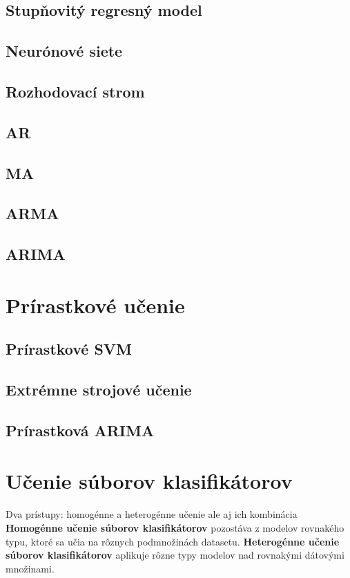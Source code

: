 \documentclass[12pt,oneside,slovak,a4paper]{book}
\begin{document}
\subsection{Stupňovitý regresný model}
\subsection{Neurónové siete}
\subsection{Rozhodovací strom}
\subsection{AR}
\subsection{MA}
\subsection{ARMA}
\subsection{ARIMA}

\section{Prírastkové učenie}
\subsection{Prírastkové SVM}
\subsection{Extrémne strojové učenie}
\subsection{Prírastková ARIMA}

\section{Učenie súborov klasifikátorov}
Dva prístupy: homogénne a heterogénne učenie ale aj ich kombinácia
\textbf{Homogénne učenie súborov klasifikátorov} pozostáva z modelov rovnakého
typu, ktoré sa učia na rôznych podmnožinách datasetu.
\textbf{Heterogénne učenie súborov klasifikátorov} aplikuje rôzne typy modelov
nad rovnakými dátovými množinami\cite{Grmanova2016}.
\end{document}
